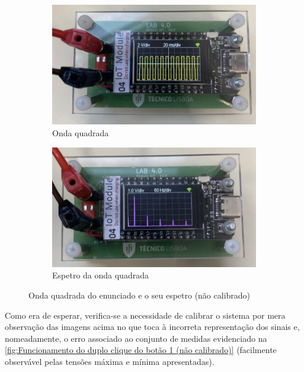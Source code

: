 \begin{figure}[H]
    \centering
    \begin{subfigure}{0.35\textwidth}
        \centering
        \includegraphics[width=1\linewidth]{Imagens/Testes no laboratório/Não calibrado/Onda quadrada do enunciado.png}
        \captionsetup{justification=centering}
        \caption{Onda quadrada}
        \label{fig:Onda quadrada não calibrado}
    \end{subfigure}
    \begin{subfigure}{0.35\textwidth}
        \centering
        \includegraphics[width=1\linewidth]{Imagens/Testes no laboratório/Não calibrado/Onda quadrada do enunciado espetro.png}
        \captionsetup{justification=centering}
        \caption{Espetro da onda quadrada}
        \label{fig:Espetro da onda quadrada não calibrado}
    \end{subfigure}
    \captionsetup{justification=centering}
    \caption{Onda quadrada do enunciado e o seu espetro (não calibrado)}
    \label{fig:Onda quadrada do enunciado e o seu espetro (não calibrado)}
\end{figure}

Como era de esperar, verifica-se a necessidade de calibrar o sistema por mera observação das imagens acima no que toca à incorreta representação dos sinais e, nomeadamente, o erro associado ao conjunto de medidas evidenciado na \autoref{fig:Funcionamento do duplo clique do botão 1 (não calibrado)} (facilmente observável pelas tensões máxima e mínima apresentadas).